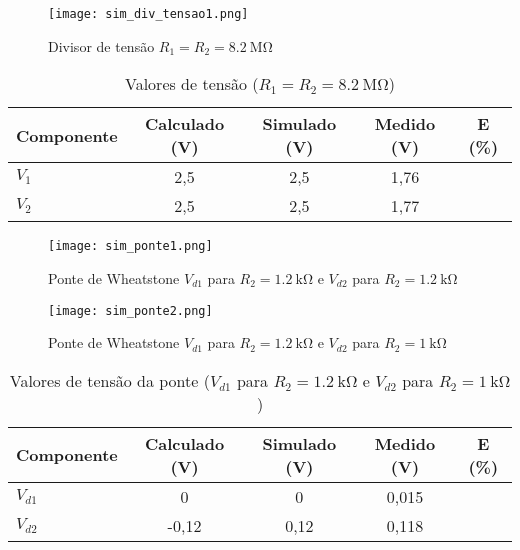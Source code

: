 \documentclass[a4paper, 12pt]{article}
\begin{document}
\begin{figure}[H]
\centering
\texttt{[image: sim\_div\_tensao1.png]}
\caption{Divisor de tensão $R_1 = R_2 = \SI{8,2}{\mega\ohm}$}
\label{fig:sim_div_tensao1}
\end{figure}

\begin{table}[H]
\centering
\caption{Valores de tensão ($R_1 = R_2 = \SI{8,2}{\mega\ohm}$)}
\label{tab:tensoes_div3}
\begin{tabular}{|l|c|c|c|c|}
\hline
\textbf{Componente} & \textbf{Calculado (\si{\volt})} & \textbf{Simulado (\si{\volt})} & \textbf{Medido (\si{\volt})} & \textbf{E (\%)} \\
\hline
$V_1$ & 2,5 & 2,5 & 1,76 &      \\ \hline
$V_2$ & 2,5 & 2,5 & 1,77 &      \\ \hline
\end{tabular}
\end{table}

\begin{figure}[H]
\centering
\texttt{[image: sim\_ponte1.png]}
\caption{Ponte de Wheatstone $V_{d1}$ para $R_2=\SI{1,2}{\kilo\ohm}$ e $V_{d2}$ para $R_2=\SI{1,2}{\kilo\ohm}$}
\label{fig:sim_ponte1}
\end{figure}

\begin{figure}[H]
\centering
\texttt{[image: sim\_ponte2.png]}
\caption{Ponte de Wheatstone $V_{d1}$ para $R_2=\SI{1,2}{\kilo\ohm}$ e $V_{d2}$ para $R_2=\SI{1}{\kilo\ohm}$}
\label{fig:sim_ponte2}
\end{figure}

\begin{table}[H]
\centering
\caption{Valores de tensão da ponte ($V_{d1}$ para $R_2=\SI{1,2}{\kilo\ohm}$ e $V_{d2}$ para $R_2=\SI{1}{\kilo\ohm}$)}
\label{tab:tensoes_ponte} 
\begin{tabular}{|l|c|c|c|c|}
\hline
\textbf{Componente} & \textbf{Calculado (\si{\volt})} & \textbf{Simulado (\si{\volt})} & \textbf{Medido (\si{\volt})} & \textbf{E (\%)} \\
\hline
$V_{d1}$ & 0 & 0 & 0,015 &      \\ \hline
$V_{d2}$ & -0,12 & 0,12 & 0,118 &      \\ \hline
\end{tabular}
\end{table}
\end{document}
